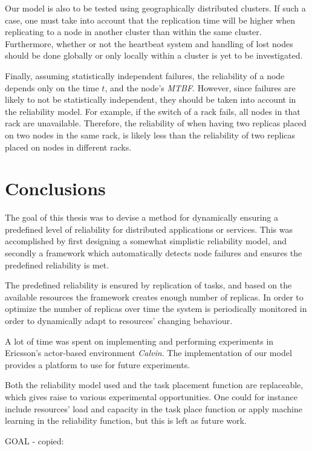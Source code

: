 \documentclass{cslthse-msc}
\begin{document}
Our model is also to be tested using geographically distributed clusters. If such a case, one must take into account that the replication time will be higher when replicating to a node in another cluster than within the same cluster. Furthermore, whether or not the heartbeat system and handling of lost nodes should be done globally or only locally within a cluster is yet to be investigated.

Finally, assuming statistically independent failures, the reliability of a node depends only on the time $t$, and the node's \emph{MTBF}. However, since failures are likely to not be statistically independent, they should be taken into account in the reliability model. For example, if the switch of a rack fails, all nodes in that rack are unavailable. Therefore, the reliability of when having two replicas placed on two nodes in the same rack, is likely less than the reliability of two replicas placed on nodes in different racks.


\chapter{Conclusions} \label{ch:conclusions}
The goal of this thesis was to devise a method for dynamically ensuring a predefined level of reliability for distributed applications or services. This was accomplished by first designing a somewhat simplistic reliability model, and secondly a framework which automatically detects node failures and ensures the predefined reliability is met. 

The predefined reliability is ensured by replication of tasks, and based on the available resources the framework creates enough number of replicas. In order to optimize the number of replicas over time the system is periodically monitored in order to dynamically adapt to resources' changing behaviour.

A lot of time was spent on implementing and performing experiments in Ericsson's actor-based environment \emph{Calvin}. The implementation of our model provides a platform to use for future experiments. 

Both the reliability model used and the task placement function are replaceable, which gives raise to various experimental opportunities. One could for instance include resources' load and capacity in the task place function or apply machine learning in the reliability function, but this is left as future work.


\iffalse
GOAL - copied:
\end{document}
